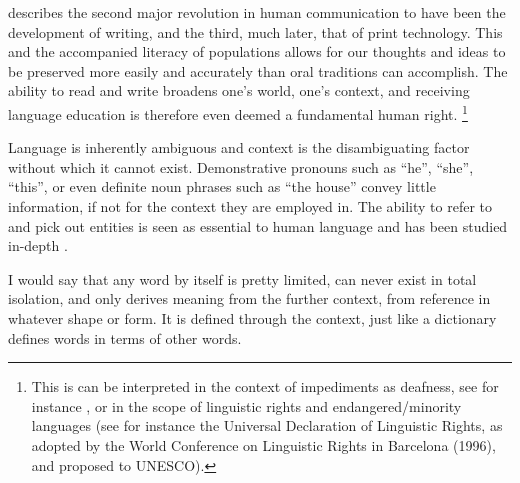 \cite{HARNAD91} describes the second major revolution in human communication to have been the development of writing,
and the third, much later, that of print technology. This and the accompanied literacy of
populations allows for our thoughts and ideas to be preserved more easily and
accurately than oral traditions can accomplish. The ability to read and write
broadens one's world, one's context, and receiving language education is
therefore even deemed a fundamental human right. \footnote{This is can be interpreted in the context of impediments as
deafness, see for instance \cite{HUMPHRIES13}, or in the scope of linguistic rights and endangered/minority
languages (see for instance the Universal Declaration of Linguistic Rights, as adopted by the World Conference on
Linguistic Rights in Barcelona (1996), and proposed to UNESCO).}

Language is inherently ambiguous and context is the disambiguating factor without which it cannot exist. Demonstrative
pronouns such as ``he'', ``she'', ``this'', or even definite noun phrases such as ``the house'' convey little
information, if not for the context they are employed in. The ability to refer to and pick out entities is seen as
essential to human language and has been studied in-depth \citep{GUNDEL19}.

I would say that any word by itself is pretty limited, can never exist in total isolation, and only derives meaning from
the further context, from reference in whatever shape or form. It is defined through the context, just like a dictionary
defines words in terms of other words.



